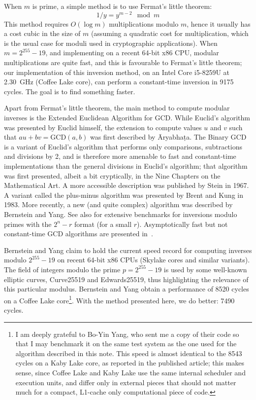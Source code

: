 \documentclass{llncs}
\begin{document}
When $m$ is prime, a simple method is to use Fermat's little theorem:
\begin{equation*}
    1/y = y^{m-2} \mod m
\end{equation*}
This method requires $O(\log m)$ multiplications modulo $m$, hence it
usually has a cost cubic in the size of $m$ (assuming a quadratic cost
for multiplication, which is the usual case for moduli used in
cryptographic applications). When $m = 2^{255}-19$, and implementing on
a recent 64-bit x86 CPU, modular multiplications are quite fast, and
this is favourable to Fermat's little theorem; our implementation of
this inversion method, on an Intel Core i5-8259U at 2.30~GHz (Coffee
Lake core), can perform a constant-time inversion in 9175 cycles. The
goal is to find something faster.

Apart from Fermat's little theorem, the main method to compute modular
inverses is the Extended Euclidean Algorithm for GCD. While Euclid's
algorithm was presented by Euclid himself\cite{Euc300BC}, the extension
to compute values $u$ and $v$ such that $au + bv = \text{GCD}(a,b)$ was
first described by \={A}ryabha\d{t}a\cite{Ary499}. The Binary GCD is a
variant of Euclid's algorithm that performs only comparisons,
subtractions and divisions by 2, and is therefore more amenable to fast
and constant-time implementations than the general divisions in Euclid's
algorithm; that algorithm was first presented, albeit a bit cryptically,
in the Nine Chapters on the Mathematical Art\cite{Chi1}. A more
accessible description was published by Stein in 1967\cite{Ste1967}. A
variant called the plus-minus algorithm was presented by Brent and Kung
in 1983\cite{BreKun1983}. More recently, a new (and quite complex)
algorithm was described by Bernstein and Yang\cite{BerYan2019}. See also
\cite{NatSar2018} for extensive benchmarks for inversions modulo primes
with the $2^n - r$ format (for a small $r$). Asymptotically fast
but not constant-time GCD algorithms are presented in~\cite{Mol2008}.

Bernstein and Yang claim to hold the current speed record for computing
inverses modulo $2^{255}-19$ on recent 64-bit x86 CPUs (Skylake cores
and similar variants). The field of integers modulo the prime $p =
2^{255}-19$ is used by some well-known elliptic curves, Curve25519 and
Edwards25519, thus highlighting the relevance of this particular
modulus. Bernstein and Yang obtain a performance of 8520 cycles on a
Coffee Lake core\footnote{I am deeply grateful to Bo-Yin Yang, who sent
me a copy of their code so that I may benchmark it on the same test
system as the one used for the algorithm described in this note. This
speed is almost identical to the 8543 cycles on a Kaby Lake core, as
reported in the published article; this makes sense, since Coffee Lake
and Kaby Lake use the same internal scheduler and execution units, and
differ only in external pieces that should not matter much for a
compact, L1-cache only computational piece of code.}. With the method
presented here, we do better: 7490 cycles.
\end{document}
